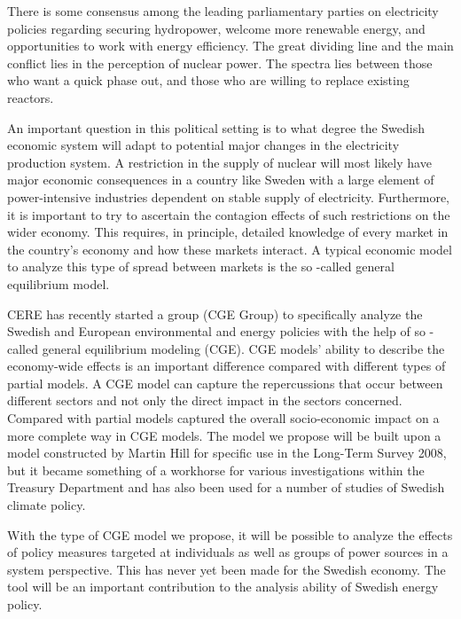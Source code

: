\documentclass[10pt,a4paper]{article}
\begin{document}
There is some consensus among the leading parliamentary parties on electricity policies regarding securing hydropower, welcome more renewable energy, and opportunities to work with energy efficiency. The great dividing line and the main conflict lies in the perception of nuclear power. The spectra lies between those who want a quick phase out, and those who are willing to replace existing reactors.

An important question in this political setting is to what degree the Swedish economic system will adapt to potential major changes in the electricity production system. A restriction in the supply of nuclear will most likely have major economic consequences in a country like Sweden with a large element of power-intensive industries dependent on stable supply of electricity. Furthermore, it is important to try to ascertain the contagion effects of such restrictions on the wider economy. This requires, in principle, detailed knowledge of every market in the country's economy and how these markets interact. A typical economic model to analyze this type of spread between markets is the so -called general equilibrium model.

CERE has recently started a group (CGE Group) to specifically analyze the Swedish and European environmental and energy policies with the help of so -called general equilibrium modeling (CGE). CGE models' ability to describe the economy-wide effects is an important difference compared with different types of partial models. A CGE model can capture the repercussions that occur between different sectors and not only the direct impact in the sectors concerned. Compared with partial models captured the overall socio-economic impact on a more complete way in CGE models. The model we propose will be built upon a model constructed by Martin Hill for specific use in the Long-Term Survey 2008, but it became something of a workhorse for various investigations within the Treasury Department and has also been used for a number of studies of Swedish climate policy.

With the type of CGE model we propose, it will be possible to analyze the effects of policy measures targeted at individuals as well as groups of power sources in a system perspective. This has never yet been made for the Swedish economy. The tool will be an important contribution to the analysis ability of Swedish energy policy.
\end{document}
